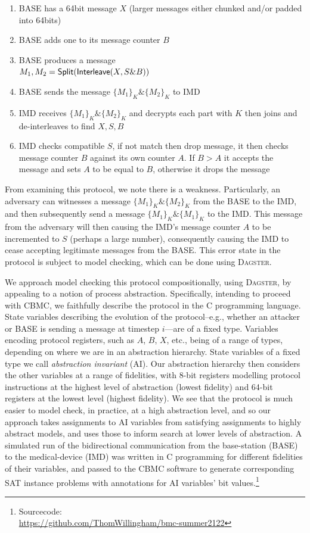 \documentclass[10pt,a4paper,oneside,headinclude,footinclude,BCOR5mm]{scrartcl}
\newcommand{\dagster}{\textsc{Dagster}\xspace}
\begin{document}
\begin{enumerate}
    \item BASE has a 64bit message $X$ (larger messages either chunked and/or padded into 64bits)
    \item BASE adds one to its message counter $B$
    \item BASE produces a message\\ $M_1,M_2=\textsf{Split}(\textsf{Interleave}(X,S\&B))$
    \item BASE sends the message $\{M_1\}_K\&\{M_2\}_K$ to IMD
    \item IMD receives $\{M_1\}_K\&\{M_2\}_K$ and decrypts each part with $K$ then joins and de-interleaves to find $X,S,B$
    \item IMD checks compatible $S$, if not match then drop message, it then checks message counter $B$ against its own counter $A$. If $B>A$ it accepts the message and sets $A$ to be equal to $B$, otherwise it drops the message
\end{enumerate}

From examining this protocol, we note there is a weakness. Particularly, an adversary can witnesses a message $\{M_1\}_K\&\{M_2\}_K$ from the BASE to the IMD, and then subsequently send a message $\{M_1\}_K\&\{M_1\}_K$ to the IMD. This message from the adversary will then causing the IMD's message counter $A$ to be incremented to $S$ (perhaps a large number), consequently causing the IMD to cease accepting legitimate messages from the BASE.
This error state in the protocol is subject to model checking, which can be done using \dagster.

We approach model checking this protocol compositionally, using \dagster, by appealing to a notion of process abstraction. 
Specifically, intending to proceed with \textsc{CBMC}, we faithfully describe the protocol in the C programming language. 
State variables describing the evolution of the protocol--e.g., whether an attacker or BASE is sending a message at timestep $i$---are of a fixed type. Variables encoding protocol registers, such as $A$, $B$, $X$, etc., being of a range of types, depending on where we are in an abstraction hierarchy. 
State variables of a fixed type we call {\em abstraction invariant} (AI).
Our abstraction hierarchy then considers the other variables at a range of fidelities, with 8-bit registers modelling protocol instructions at the highest level of abstraction (lowest fidelity) and 64-bit registers at the lowest level (highest fidelity).
We see that the protocol is much easier to model check, in practice, at a high abstraction level, and so our approach takes assignments to AI variables from satisfying assignments to highly abstract models, and uses those to inform search at lower levels of abstraction.  
A simulated run of the bidirectional communication from the base-station (BASE) to the medical-device (IMD) was written in C programming for different fidelities of their variables, and passed to the CBMC software to generate corresponding SAT instance problems with annotations for AI variables' bit values.\footnote{%
Sourcecode:\\ \url{https://github.com/ThomWillingham/bmc-summer2122}}
\end{document}
